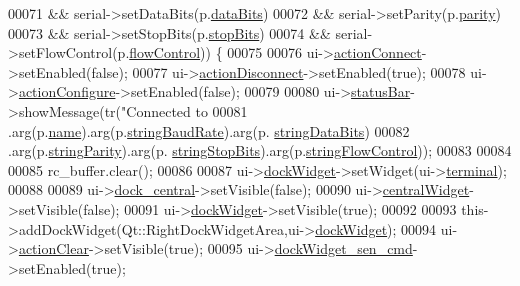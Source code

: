 \begin{DoxyCode}
00071                 && serial->setDataBits(p.\hyperlink{a00022_a7dcd85d028a09508cb4567cf631b40e9}{dataBits})
00072                 && serial->setParity(p.\hyperlink{a00022_ae08a00aa2e45218dade9046e3624cce7}{parity})
00073                 && serial->setStopBits(p.\hyperlink{a00022_ab88ff384f7c1127bcbe2dd97b49696a4}{stopBits})
00074                 && serial->setFlowControl(p.\hyperlink{a00022_aa962a6e7dbb8338af154305e4ff46cfc}{flowControl})) \{
00075 
00076             ui->\hyperlink{a00027_aa0785566311fc48271690fb68b1d4c5f}{actionConnect}->setEnabled(\textcolor{keyword}{false});
00077             ui->\hyperlink{a00027_a8a16b3aef75b279eaaa887152d2f746b}{actionDisconnect}->setEnabled(\textcolor{keyword}{true});
00078             ui->\hyperlink{a00027_a3860abde3cfd3f6170e28fddde73f11e}{actionConfigure}->setEnabled(\textcolor{keyword}{false});
00079 
00080             ui->\hyperlink{a00027_a50fa481337604bcc8bf68de18ab16ecd}{statusBar}->showMessage(tr(\textcolor{stringliteral}{"Connected to %
00081                                        .arg(p.\hyperlink{a00022_a973c8cfb942a512f34fc4227c0caa6dd}{name}).arg(p.\hyperlink{a00022_a54e9d461f783386f314bc24b96665e53}{stringBaudRate}).arg(p.
      \hyperlink{a00022_ab589b733b78af17744ab75067bfce051}{stringDataBits})
00082                                        .arg(p.\hyperlink{a00022_aa2c662b2fb315f038e827d63d83b059b}{stringParity}).arg(p.
      \hyperlink{a00022_abde3c8410f779688ce6c2fcbbbb84f10}{stringStopBits}).arg(p.\hyperlink{a00022_a1b0a388ec5059bd2628acf9b7728f2f3}{stringFlowControl}));
00083 
00084 
00085            rc\_buffer.clear();
00086 
00087            ui->\hyperlink{a00027_ac8a083c4b66fb317a9b538409ce412e2}{dockWidget}->setWidget(ui->\hyperlink{a00027_aae71c46ea4546df5994735dee573b2dd}{terminal});
00088 
00089            ui->\hyperlink{a00027_a19105d0d919fa33b5f29f7677bbab054}{dock\_central}->setVisible(\textcolor{keyword}{false});
00090            ui->\hyperlink{a00027_a30075506c2116c3ed4ff25e07ae75f81}{centralWidget}->setVisible(\textcolor{keyword}{false});
00091            ui->\hyperlink{a00027_ac8a083c4b66fb317a9b538409ce412e2}{dockWidget}->setVisible(\textcolor{keyword}{true});
00092 
00093            this->addDockWidget(Qt::RightDockWidgetArea,ui->\hyperlink{a00027_ac8a083c4b66fb317a9b538409ce412e2}{dockWidget});
00094            ui->\hyperlink{a00027_ac8539dcd87955047877cb256aff60453}{actionClear}->setVisible(\textcolor{keyword}{true});
00095            ui->\hyperlink{a00027_a9eb86a5ee396766f0f4a65f2d2bd7688}{dockWidget\_sen\_cmd}->setEnabled(\textcolor{keyword}{true});
}
\end{DoxyCode}
